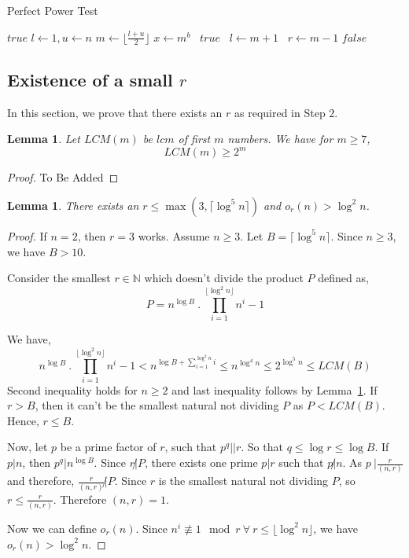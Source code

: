 \documentclass[11pt]{article}
\newtheorem{lemma}[theorem]{Lemma}
\begin{document}
\begin{algorithm}
\caption{Perfect Power Test}
\label{alg:PerfectPowerTest}
\begin{algorithmic}
	\State \Return $true$
\EndIf
{}
	\State $l \gets 1, u \gets n$
		\State $m \gets \lfloor \frac{l+u}{2} \rfloor$
		\State $x \gets m^b$ 
			\ \Return $true$
			\ $l \gets m+1$
		\Else
			\ $r \gets m-1$
		\EndIf
	\EndWhile
\EndFor
\State \Return $false$
\EndProcedure
\end{algorithmic}
\end{algorithm}


\subsection {Existence of a small $r$}
In this section, we prove that there exists an $r$ as required in Step $2$.

\begin{lemma}
\label{lemma:LCMLemma}
Let $LCM(m)$ be $lcm$ of first $m$ numbers. We have for $m \geq 7$,
\[LCM(m) \geq 2^m\]
\end{lemma}
\begin{proof}
To Be Added
\end{proof}

\begin{lemma}
\label{lemma:AKSLemma2}
There exists an $r \leq \max(3, \lceil \log^5 n \rceil)$ and $o_r(n) > \log^2 n$.
\end{lemma}
\begin{proof}
If $n = 2$, then $r = 3$ works. Assume $n \geq 3$. Let $B = \lceil \log^5 n \rceil$. Since $n \geq 3$, we have $B > 10$. 

Consider the smallest $r \in \mathbb{N}$ which doesn't divide the product $P$ defined as,
\[P = n^{\log B}\ .\ \prod_{i=1}^{\lfloor \log^2 n \rfloor}{n^i-1} \]

We have,
\[n^{\log B}\ .\ \prod_{i=1}^{\lfloor \log^2 n \rfloor}{n^i-1} < n^{\log B + \sum_{i=1}^{\log^2 n}i} \leq n^{\log^4 n} \leq 2^{\log^5 n} \leq LCM(B)\]
Second inequality holds for $n \geq 2$ and last inequality follows by Lemma~\ref{lemma:LCMLemma}. If $r > B$, then it can't be the smallest natural not dividing $P$ as $P < LCM(B)$. Hence, $r \leq B$.

Now, let $p$ be a prime factor of $r$, such that $p^q || r$. So that $q \leq \log r \leq \log B$. If $p | n$, then $p^q | n^{\log B}$. Since $r \not | P$, there exists one prime $p | r$ such that $p \not | n$. As $p \ |  \frac{r}{(n,r)}$ and therefore, $\frac{r}{(n,r)} \not | P$. Since $r$ is the smallest natural not dividing $P$, so $r \leq \frac{r}{(n,r)}$. Therefore $(n,r) = 1$. 

Now we can define $o_r(n)$. Since $n^i \not \equiv 1 \mod r \ \forall \ r \leq \lfloor \log^2 n \rfloor$, we have $o_r(n) > \log^2 n$.
\end{proof}
\end{document}
